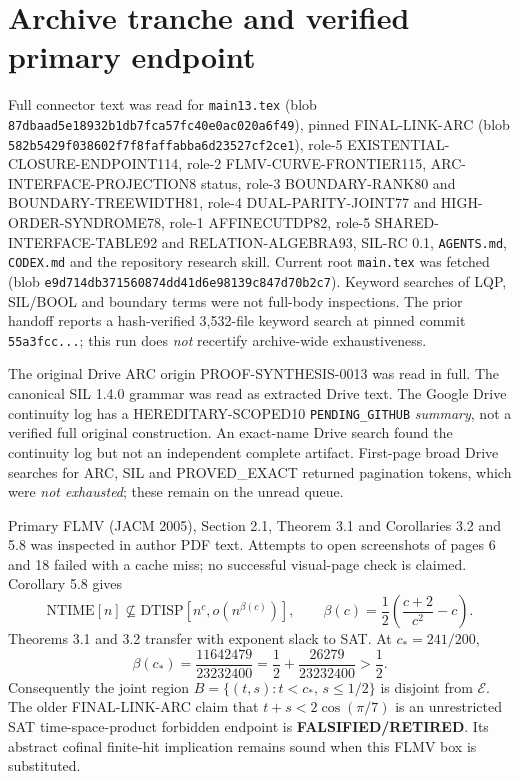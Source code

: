\documentclass[11pt]{article}
\newcommand{\EE}{\mathcal E}
\begin{document}
\section{Archive tranche and verified primary endpoint}
Full connector text was read for \texttt{main13.tex} (blob \texttt{87dbaad5e18932b1db7fca57fc40e0ac020a6f49}), pinned FINAL-LINK-ARC (blob \texttt{582b5429f038602f7f8faffabba6d23527cf2ce1}), role-5 EXISTENTIAL-CLOSURE-ENDPOINT114, role-2 FLMV-CURVE-FRONTIER115, ARC-INTERFACE-PROJECTION8 status, role-3 BOUNDARY-RANK80 and BOUNDARY-TREEWIDTH81, role-4 DUAL-PARITY-JOINT77 and HIGH-ORDER-SYNDROME78, role-1 AFFINECUTDP82, role-5 SHARED-INTERFACE-TABLE92 and RELATION-ALGEBRA93, SIL-RC 0.1, \texttt{AGENTS.md}, \texttt{CODEX.md} and the repository research skill. Current root \texttt{main.tex} was fetched (blob \texttt{e9d714db371560874dd41d6e98139c847d70b2c7}). Keyword searches of LQP, SIL/BOOL and boundary terms were not full-body inspections. The prior handoff reports a hash-verified 3,532-file keyword search at pinned commit \texttt{55a3fcc...}; this run does \emph{not} recertify archive-wide exhaustiveness.

The original Drive ARC origin PROOF-SYNTHESIS-0013 was read in full. The canonical SIL 1.4.0 grammar was read as extracted Drive text. The Google Drive continuity log has a HEREDITARY-SCOPED10 \texttt{PENDING_GITHUB} \emph{summary}, not a verified full original construction. An exact-name Drive search found the continuity log but not an independent complete artifact. First-page broad Drive searches for ARC, SIL and PROVED\_EXACT returned pagination tokens, which were \emph{not exhausted}; these remain on the unread queue.

Primary FLMV (JACM 2005), Section 2.1, Theorem 3.1 and Corollaries 3.2 and 5.8 was inspected in author PDF text. Attempts to open screenshots of pages 6 and 18 failed with a cache miss; no successful visual-page check is claimed. Corollary 5.8 gives
\[
\mathrm{NTIME}[n]\not\subseteq\mathrm{DTISP}[n^c,o(n^{\beta(c)})],
\qquad \beta(c)=\frac12\left(\frac{c+2}{c^2}-c\right).
\]
Theorems 3.1 and 3.2 transfer with exponent slack to SAT. At $c_*=241/200$,
\[
\beta(c_*)=\frac{11642479}{23232400}
=\frac12+\frac{26279}{23232400}>\frac12.
\]
Consequently the joint region $B=\{(t,s):t<c_*,\,s\le1/2\}$ is disjoint from $\EE$. The older FINAL-LINK-ARC claim that $t+s<2\cos(\pi/7)$ is an unrestricted SAT time-space-product forbidden endpoint is \textbf{FALSIFIED/RETIRED}. Its abstract cofinal finite-hit implication remains sound when this FLMV box is substituted.
\end{document}
